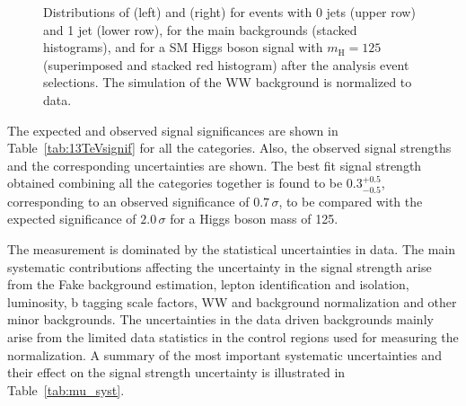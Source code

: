 \begin{figure}
{}
\caption{Distributions of \mll (left) and \mt (right) for events with 0 jets (upper row) and 1 jet (lower row), for the main backgrounds (stacked histograms), and for a SM Higgs boson signal with $m_\mathrm{H}=125$\GeV (superimposed and stacked red histogram) after the analysis event selections. The simulation of the WW background is normalized to data.}\label{fig:mllandmt}
\end{figure}

The expected and observed signal significances are shown in Table~\ref{tab:13TeVsignif} for all the categories. Also, the observed signal strengths and the corresponding uncertainties are shown. The best fit signal strength obtained combining all the categories together is found to be $0.3^{+0.5}_{-0.5}$, corresponding to an observed significance of $0.7\,\sigma$, to be compared with the expected significance of $2.0\,\sigma$ for a Higgs boson mass of 125\GeV.

The measurement is dominated by the statistical uncertainties in data. The main systematic contributions affecting the uncertainty in the signal strength arise from the Fake background estimation, lepton identification and isolation, luminosity, b tagging scale factors, WW and \ttbar background normalization and other minor backgrounds. The uncertainties in the data driven backgrounds mainly arise from the limited data statistics in the control regions used for measuring the normalization.
A summary of the most important systematic uncertainties and their effect on the signal strength uncertainty is illustrated in Table~\ref{tab:mu_syst}.

